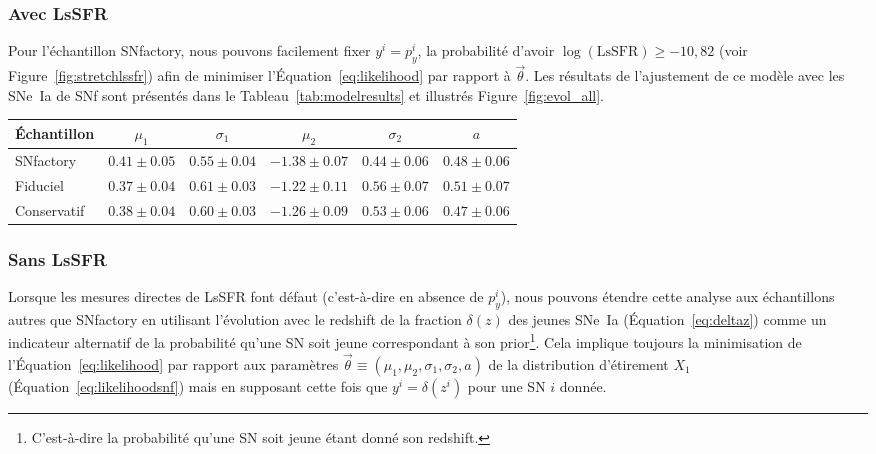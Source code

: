 \documentclass[../main/main.tex]{subfiles}
\begin{document}
\subsubsection*{Avec LsSFR}\label{sssec:lssfr}

Pour l'échantillon SNfactory, nous pouvons facilement fixer $y^i = p_y^i$, la
probabilité d'avoir $\log(\mathrm{LsSFR}) \geq -10,82$ (voir
Figure~\ref{fig:stretchlssfr}) afin de minimiser l'Équation~\ref{eq:likelihood}
par rapport à $\overrightarrow{\theta}$. Les résultats de l'ajustement de ce
modèle avec les SNe~Ia de SNf sont présentés dans le
Tableau~\ref{tab:modelresults} et illustrés Figure~\ref{fig:evol_all}.

\begin{table*}
    \centering
    \caption[Valeurs des paramètres du modèle d'étirement de base selon
    l'échantillon]{Valeurs des paramètres issus des meilleurs ajustements du
        modèle de distribution de l'étirement de base lorsqu'il est
        appliqué à l'ensemble de données de SNfactory seulement (114 SNe~Ia), à
        l'échantillon fiduciel (569 SNe~Ia) ou à l'échantillon conservatif
    (422).}
    \label{tab:modelresults}
    \begin{tabular}{lccccc}
        \toprule
        Échantillon & $\mu_1$             & $\sigma_1$
                    & $\mu_2$             & $\sigma_2$
                    & $a$ \\
        \midrule
        SNfactory   & $ 0.41 \pm 0.05$    & $0.55 \pm 0.04$
                    & $-1.38 \pm 0.07$    & $0.44 \pm 0.06$
                    & $ 0.48 \pm 0.06$ \\
        Fiduciel    & $ 0.37 \pm 0.04$    & $0.61 \pm 0.03$
                    & $-1.22 \pm 0.11$    & $0.56 \pm 0.07$
                    & $ 0.51 \pm 0.07$ \\
        Conservatif & $ 0.38 \pm 0.04$    & $0.60 \pm 0.03$
                    & $-1.26 \pm 0.09$    & $0.53 \pm 0.06$
                    & $ 0.47 \pm 0.06$ \\
        \bottomrule
    \end{tabular}
\end{table*}

\subsubsection*{Sans LsSFR}\label{sssec:z}

Lorsque les mesures directes de LsSFR font défaut (c'est-à-dire en absence de
$p_y^i$), nous pouvons étendre cette analyse aux échantillons autres que
SNfactory en utilisant l'évolution avec le redshift de la fraction $\delta(z)$
des jeunes SNe~Ia (Équation~\ref{eq:deltaz}) comme un indicateur alternatif de
la probabilité qu'une SN soit jeune correspondant à son
prior\footnote{C'est-à-dire la probabilité qu'une SN soit jeune étant donné son
redshift.}. Cela implique toujours la minimisation de
l'Équation~\ref{eq:likelihood} par rapport aux paramètres 
$\overrightarrow{\theta}\equiv(\mu_1, \mu_2, \sigma_1, \sigma_2, a)$ de la
distribution d'étirement $X_1$ (Équation~\ref{eq:likelihoodsnf}) mais en
supposant cette fois que $y^i = \delta(z^i)$ pour une SN $i$ donnée.
\end{document}
